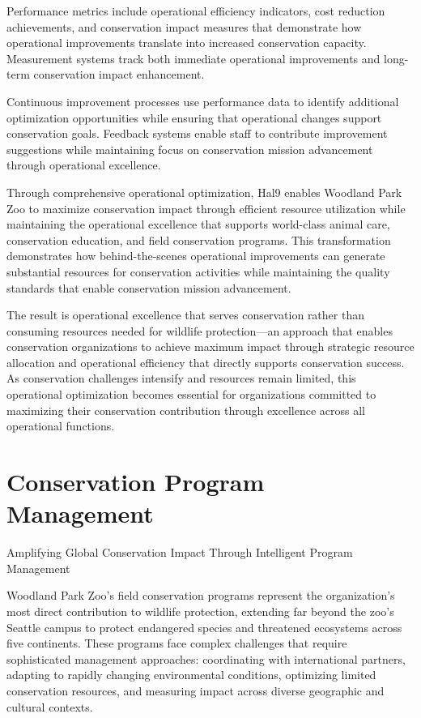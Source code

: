\documentclass[
  Letterpaper,
]{scrbook}
\begin{document}
Performance metrics include operational efficiency indicators, cost
reduction achievements, and conservation impact measures that
demonstrate how operational improvements translate into increased
conservation capacity. Measurement systems track both immediate
operational improvements and long-term conservation impact enhancement.

Continuous improvement processes use performance data to identify
additional optimization opportunities while ensuring that operational
changes support conservation goals. Feedback systems enable staff to
contribute improvement suggestions while maintaining focus on
conservation mission advancement through operational excellence.

Through comprehensive operational optimization, Hal9 enables Woodland
Park Zoo to maximize conservation impact through efficient resource
utilization while maintaining the operational excellence that supports
world-class animal care, conservation education, and field conservation
programs. This transformation demonstrates how behind-the-scenes
operational improvements can generate substantial resources for
conservation activities while maintaining the quality standards that
enable conservation mission advancement.

The result is operational excellence that serves conservation rather
than consuming resources needed for wildlife protection---an approach
that enables conservation organizations to achieve maximum impact
through strategic resource allocation and operational efficiency that
directly supports conservation success. As conservation challenges
intensify and resources remain limited, this operational optimization
becomes essential for organizations committed to maximizing their
conservation contribution through excellence across all operational
functions.


\chapter{Conservation Program
Management}\label{conservation-program-management}

Amplifying Global Conservation Impact Through Intelligent Program
Management

\hfill\break

Woodland Park Zoo's field conservation programs represent the
organization's most direct contribution to wildlife protection,
extending far beyond the zoo's Seattle campus to protect endangered
species and threatened ecosystems across five continents. These programs
face complex challenges that require sophisticated management
approaches: coordinating with international partners, adapting to
rapidly changing environmental conditions, optimizing limited
conservation resources, and measuring impact across diverse geographic
and cultural contexts.
\end{document}
